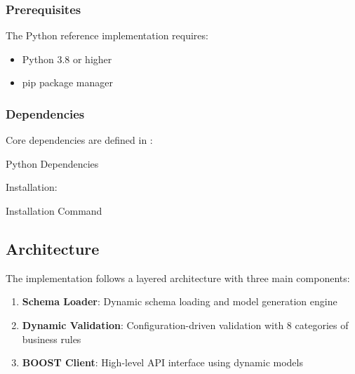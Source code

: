 \subsubsection{Prerequisites}
\label{sec:python-prerequisites}

The Python reference implementation requires:

\begin{itemize}
    \item Python 3.8 or higher
    \item pip package manager
\end{itemize}

\subsubsection{Dependencies}
\label{sec:python-dependencies}

Core dependencies are defined in :

\begin{pythonexample}{Python Dependencies}
\end{pythonexample}

Installation:

\begin{pythonexample}{Installation Command}
\end{pythonexample}

\subsection{Architecture}
\label{sec:python-architecture}

The implementation follows a layered architecture with three main components:

\begin{enumerate}
    \item \textbf{Schema Loader}: Dynamic schema loading and model generation engine
    \item \textbf{Dynamic Validation}: Configuration-driven validation with 8 categories of business rules
    \item \textbf{BOOST Client}: High-level API interface using dynamic models
\end{enumerate}


